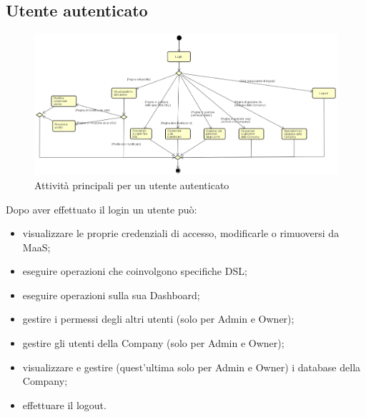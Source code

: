 \subsection{Utente autenticato}
\begin{figure}[H]
\begin{center}
\includegraphics[width=15cm]{res/sections/backend/activities/principaliConAuth.png}
\caption{Attività principali per un utente autenticato}
\end{center}
\end{figure}
Dopo aver effettuato il login un utente può:
\begin{itemize}
\item visualizzare le proprie credenziali di accesso, modificarle o rimuoversi da MaaS;
\item eseguire operazioni che coinvolgono specifiche DSL;
\item eseguire operazioni sulla sua Dashboard;
\item gestire i permessi degli altri utenti (solo per Admin e Owner);
\item gestire gli utenti della Company (solo per Admin e Owner);
\item visualizzare e gestire (quest'ultima solo per Admin e Owner) i database della Company;
\item effettuare il logout.
\end{itemize}
